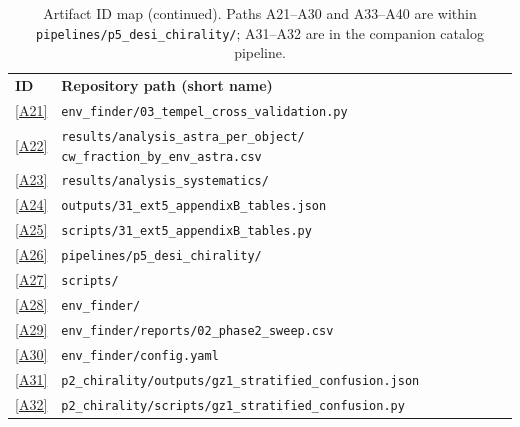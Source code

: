 \documentclass[aps,prd,twocolumn,superscriptaddress,showpacs,preprintnumbers,nofootinbib,longbibliography,floatfix]{revtex4-2}
\newcommand{\repoBase}{https://github.com/Hubify-Projects/bigbounce/blob/main}
\begin{document}
\begin{table}[p]
{\small
\caption{Artifact ID map (continued). Paths A21--A30 and A33--A40 are
within \texttt{pipelines/p5\_desi\_chirality/}; A31--A32 are in the
companion catalog pipeline.}
\begin{ruledtabular}
\begin{tabular}{lp{}}
\textbf{ID} & \textbf{Repository path (short name)} \\
\colrule
\href{\repoBase/pipelines/p5\_desi\_chirality/env\_finder/03\_tempel\_cross\_validation.py}{[A21]} & \texttt{env\_finder/03\_tempel\_cross\_validation.py} \\
\href{\repoBase/pipelines/p5\_desi\_chirality/results/analysis\_astra\_per\_object/cw\_fraction\_by\_env\_astra.csv}{[A22]} & \texttt{results/analysis\_astra\_per\_object/} \texttt{cw\_fraction\_by\_env\_astra.csv} \\
\href{\repoBase/pipelines/p5\_desi\_chirality/results/analysis\_systematics/}{[A23]} & \texttt{results/analysis\_systematics/} \\
\href{\repoBase/pipelines/p5\_desi\_chirality/outputs/31\_ext5\_appendixB\_tables.json}{[A24]} & \texttt{outputs/31\_ext5\_appendixB\_tables.json} \\
\href{\repoBase/pipelines/p5\_desi\_chirality/scripts/31\_ext5\_appendixB\_tables.py}{[A25]} & \texttt{scripts/31\_ext5\_appendixB\_tables.py} \\
\href{\repoBase/pipelines/p5\_desi\_chirality/}{[A26]} & \texttt{pipelines/p5\_desi\_chirality/} \\
\href{\repoBase/pipelines/p5\_desi\_chirality/scripts/}{[A27]} & \texttt{scripts/} \\
\href{\repoBase/pipelines/p5\_desi\_chirality/env\_finder/}{[A28]} & \texttt{env\_finder/} \\
\href{\repoBase/pipelines/p5\_desi\_chirality/env\_finder/reports/02\_phase2\_sweep.csv}{[A29]} & \texttt{env\_finder/reports/02\_phase2\_sweep.csv} \\
\href{\repoBase/pipelines/p5\_desi\_chirality/env\_finder/config.yaml}{[A30]} & \texttt{env\_finder/config.yaml} \\
\href{\repoBase/pipelines/p2\_chirality/outputs/gz1\_stratified\_confusion.json}{[A31]} & \texttt{p2\_chirality/outputs/gz1\_stratified\_confusion.json} \\
\href{\repoBase/pipelines/p2\_chirality/scripts/gz1\_stratified\_confusion.py}{[A32]} & \texttt{p2\_chirality/scripts/gz1\_stratified\_confusion.py} \\

\end{tabular}
\end{ruledtabular}}
\end{table}
\end{document}
